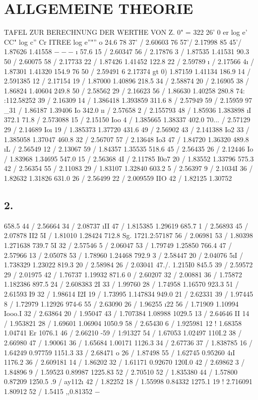 \documentclass[12pt,a4paper]{article}
\begin{document}
\newpage


\section*{ALLGEMEINE THEORIE}
TAFEL ZUR BERECHNUNG DER WERTHE VON Z. 0" = 322\textdegree{} 26' \textregistered{} 0\textdegree{} er log e' CC" log c'' Cr ITREE log e''"'' o\textdegree{} 24.6 78\textdegree{} 37' / 2.60603 76\textdegree{} 57'/ 2.17998 85\textdegree{} 45'/ 1.87626 1.41558
$---$
\i{} 57.6 15 / 2.60347 56 / 2.17876 3 / 1.87535 1.41531 90.3 50 / 2.60075 58 / 2.17733 22 / 1.87426 1.41452 122.8 22 / 2.59789 \i{} / 2.17566 4\i{} / 1.87301 1.41320 154.9 76 50 / 2.59491 6 2.17374 gt 0) 1.87159 1.41134 186.9 14 / 2.591385 12 / 2.17154 19 / 1.87000 1.40896 218.5 34 / 2.58874 20 / 2.16905 38 / 1.86824 1.40604 249.8 50 / 2.58562 29 / 2.16623 56 / 1.86630 1.40258 280.8 74: :112.58252 39 / 2.16309 14 / 1.386418 1.393859 311.6 8 / 2.57949 59 / 2.15959 97 \_31 / 1.86187 1.39406 Io 342.0 \i{}\i{} / 2.57658 2 / 2.155793 48 / 1.85936 1.383898 \i{}I 372.1 71.8 / 2.573088 15 / 2.15150 Ioo 4 / 1.385665 1.38337 402.0 70... / 2.57129 29 / 2.14689 Io\i{} 19 / 1.385373 1.37720 431.6 49 / 2.56902 43 / 2.141388 Io2 33 / 1.385058 1.37047 460.8 32 / 2.56707 57 / 2.13648 Io3 47 / 1.84720 1.36320 489.8 \i{}L / 2.56549 12 / 2.13067 59 / 1.84357 1.35535 518.6 45 / 2.56435 26 / 2.12446 Io / 1.83968 1.34695 547.0 15 / 2.56368 4I / 2.11785 I0o7 20 / 1.83552 1.33796 575.3 42 / 2.56354 55 / 2.11083 29 / 1.83107 1.32840 603.2 5 / 2.56397 9 /  2.1034I 36 / 1.82632 1.31826 631.0 26 / 2.56499 22 / 2.009559 IIO 42 / 1.82125 1.30752

\subsection*{2.}
658.5 44 / 2.56664 34 / 2.08737 \i{}II 47 / 1.815385 1.29619 685.7 1 / 2.56893 45 / 2.07878 II2 5I / 1.81010 1.28424 712.8 Sg. \guillemotright{}1721.2:57187 56 / 2.06981 53 / 1.80398 1.271638 739.7 5I 32 / 2.57546 5 / 2.06047 53 / 1.79749 1.25850 766.4 47 / 2.57966 13 / 2.05078 53 / 1.78960 1.24468 792.9 3 / 2.58447 20 / 2.04076 5\i{}I / 1.738329 1.23022 819.3 20 / 2.58984 26 / 2.03041 47./. 1.215I0 845.5 39 / 2.59572 29 / 2.01975 42 / 1.76737 1.19932 871.6 0 / 2.60207 32 / 2.00881 36 / 1.75872 1.182386 897.5 24 / 2.608383 2I 33 / 1.99760 28 / 1.74958 1.16570 923.3 51 / 2.61593 I9 32 / 1.98614 I2I 19 / 1.73995 1.147834 949.0 21 / 2.62331 39 /  1.97445 8 /  1.72979 1.12926 974-6 55 / 2.63090 26 / 1.96255 \i{}22 56 / 1.71909 1.10994 Iooo.I 32 / 2.63864 20 /  1.95047 43 / 1.707384 1.08988 1029.5 13 / 2.64646 II 14 / 1.953821 28 / 1.69601 1.06904 1050.9 58 / 2.65430 6 /  1.925981 12 ! 1.68358 1.04741 Er 1076.1 46 / 2.66210 -59 / 1:91327 54 / 1.67053 1.02497 110I.2 38 / 2.66980 47 / 1.90061 36 / 1.65684 1.00171 1126.3 34 / 2.67736 37 / 1.838785 16 / 1.64249 0.97759 1151.3 33 / 2.68471 o 26 / 1.87498 55 / 1.62745 0.95260 4\i{}I 1176.2 36 / 2.609181 14 / 1.86202 32 / 1.61171 0.92670 120I.0 42 / 2.69862 3 / 1.84896 9 /  1.59523 0.89987 1225.83 52 / 2.70510 52 / 1.835380 44 / 1.57800 0.87209 1250.5 .9 / ay112\i{} 42 / 1.82252 18 / 1.55998 0.84332 1275.1 19 ! 2.716091 1.80912 52 / 1.5415 ,,0.81352
$-$
\end{document}
